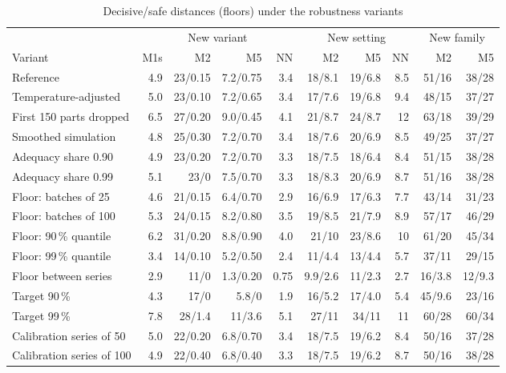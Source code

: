 \documentclass[pdflatex,sn-basic]{sn-jnl}
\newcommand{\tabsize}{\fontsize{8}{9.5}\selectfont}
\begin{document}
\begin{table}[tbp]
\tabsize
\setlength{\tabcolsep}{2.4pt}
\caption{Decisive/safe distances (floors) under the robustness variants}\label{tab:robust}
\begin{tabular}{@{}lrrrrrrrrr@{}}
\toprule
 & \multicolumn{4}{c}{New variant} & \multicolumn{3}{c}{New setting} & \multicolumn{2}{c}{New family} \\
\cmidrule(lr){2-5}\cmidrule(lr){6-8}\cmidrule(lr){9-10}
Variant & M1s & M2 & M5 & NN & M2 & M5 & NN & M2 & M5 \\
\midrule
Reference & 4.9 & 23/0.15 & 7.2/0.75 & 3.4 & 18/8.1 & 19/6.8 & 8.5 & 51/16 & 38/28 \\
Temperature-adjusted & 5.0 & 23/0.10 & 7.2/0.65 & 3.4 & 17/7.6 & 19/6.8 & 9.4 & 48/15 & 37/27 \\
First 150 parts dropped & 6.5 & 27/0.20 & 9.0/0.45 & 4.1 & 21/8.7 & 24/8.7 & 12 & 63/18 & 39/29 \\
Smoothed simulation & 4.8 & 25/0.30 & 7.2/0.70 & 3.4 & 18/7.6 & 20/6.9 & 8.5 & 49/25 & 37/27 \\
Adequacy share 0.90 & 4.9 & 23/0.20 & 7.2/0.70 & 3.3 & 18/7.5 & 18/6.4 & 8.4 & 51/15 & 38/28 \\
Adequacy share 0.99 & 5.1 & 23/0 & 7.5/0.70 & 3.3 & 18/8.3 & 20/6.9 & 8.7 & 51/16 & 38/28 \\
Floor: batches of 25 & 4.6 & 21/0.15 & 6.4/0.70 & 2.9 & 16/6.9 & 17/6.3 & 7.7 & 43/14 & 31/23 \\
Floor: batches of 100 & 5.3 & 24/0.15 & 8.2/0.80 & 3.5 & 19/8.5 & 21/7.9 & 8.9 & 57/17 & 46/29 \\
Floor: 90\,\% quantile & 6.2 & 31/0.20 & 8.8/0.90 & 4.0 & 21/10 & 23/8.6 & 10 & 61/20 & 45/34 \\
Floor: 99\,\% quantile & 3.4 & 14/0.10 & 5.2/0.50 & 2.4 & 11/4.4 & 13/4.4 & 5.7 & 37/11 & 29/15 \\
Floor between series & 2.9 & 11/0 & 1.3/0.20 & 0.75 & 9.9/2.6 & 11/2.3 & 2.7 & 16/3.8 & 12/9.3 \\
Target 90\,\% & 4.3 & 17/0 & 5.8/0 & 1.9 & 16/5.2 & 17/4.0 & 5.4 & 45/9.6 & 23/16 \\
Target 99\,\% & 7.8 & 28/1.4 & 11/3.6 & 5.1 & 27/11 & 34/11 & 11 & 60/28 & 60/34 \\
Calibration series of 50 & 5.0 & 22/0.20 & 6.8/0.70 & 3.4 & 18/7.5 & 19/6.2 & 8.4 & 50/16 & 37/28 \\
Calibration series of 100 & 4.9 & 22/0.40 & 6.8/0.40 & 3.3 & 18/7.5 & 19/6.2 & 8.7 & 50/16 & 38/28 \\

\end{tabular}
\end{table}
\end{document}
